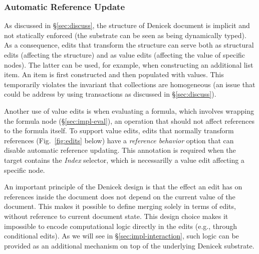 \documentclass[sigconf,anonymous,screen]{acmart}
\newcommand{\ident}[1]{{\sffamily #1}}
\newcommand{\note}[1]{\textcolor{red}{#1}}
\begin{document}

\subsubsection*{Automatic Reference Update}
As discussed in \S\ref{sec:discuss}, the structure of Denicek document is implicit and not
statically enforced (the substrate can be seen as being dynamically typed). As a consequence, edits
that transform the structure can serve both as structural edits (affecting the structure)
and as value edits (affecting the value of specific nodes). The latter can be used, for example,
when constructing an additional list item. An item is first constructed and then populated
with values. This temporarily violates the invariant that collections are homogeneous
(an issue that could be address by using transactions as discussed in \S\ref{sec:discuss}).

Another use of value edits is when evaluating a formula, which involves wrapping the formula
node (\S\ref{sec:impl-eval}), an operation that should not affect references to the formula
itself. To support value edits, edits that normally transform references (Fig.~\ref{fig:edits} below)
have a \emph{reference behavior} option that can disable automatic reference
updating. This annotation is required when the target contains the \emph{Index} selector,
which is necessarilly a value edit affecting a specific node.

%

An important principle of the Denicek design is that the effect an edit has on references inside
the document does not depend on the current value of the document. This makes it possible to
define merging solely in terms of edits, without reference to current document state.
This design choice makes it impossible to encode computational logic directly in the edits
(e.g., through conditional edits). As we will see in \S\ref{sec:impl-interaction}, such logic
can be provided as an additional mechanism on top of the underlying Denicek substrate.
\end{document}
